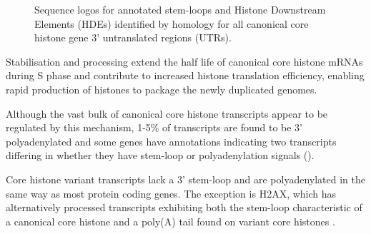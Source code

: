   \begin{figure}
    \centering
    \hfill
    \caption{%
      Sequence logos for
      \protect{} annotated stem-loops and
      \protect{}  Histone Downstream Elements (HDEs)
      identified by homology
      for all canonical core histone gene 3' untranslated regions (UTRs).
    }
  \end{figure}

  Stabilisation and processing extend the half life of canonical core histone \mbox{mRNAs}
  during S phase and contribute to increased histone translation efficiency,
  enabling rapid production of histones to package the newly duplicated genomes.

  Although the vast bulk of canonical core histone transcripts
  appear to be regulated by this mechanism,
  1-5\% of transcripts are found to be 3' polyadenylated \citep{YangGenomeBiol2011}
  and some genes have annotations indicating two transcripts
  differing in whether they have stem-loop or polyadenylation
  signals ().

  Core histone variant transcripts lack a 3' stem-loop and are
  polyadenylated in the same way as most protein coding genes.
  The exception is H2AX, which has alternatively processed transcripts
  exhibiting both the stem-loop characteristic of a canonical core histone
  and a poly(A) tail found on variant core histones \citep{HTwoAX-transcripts,our-H2AX-review}.
